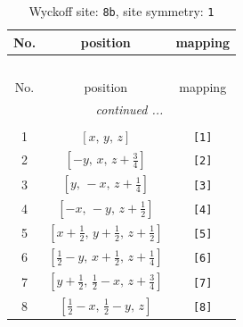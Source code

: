 \documentclass[fleqn,8pt]{jsarticle}
\begin{document}
\begin{longtable}{ccc}
\caption{Wyckoff site: {\tt 8b}, site symmetry: {\tt 1}}
 \\
 \hline \hline
No. & position & mapping \\ \hline \endfirsthead

\multicolumn{2}{l}{\tablename\ \thetable{}} \\
 \hline \hline
No. & position & mapping \\ \hline \endhead

 \hline \hline
\multicolumn{2}{r}{\footnotesize\it continued ...} \\ \endfoot

 \hline \hline
\multicolumn{2}{r}{} \\ \endlastfoot

1 & $\left[ x,\, y,\, z \right]$ & {\tt [1]} \\ \hline
2 & $\left[ - y,\, x,\, z + \frac{3}{4} \right]$ & {\tt [2]} \\ \hline
3 & $\left[ y,\, - x,\, z + \frac{1}{4} \right]$ & {\tt [3]} \\ \hline
4 & $\left[ - x,\, - y,\, z + \frac{1}{2} \right]$ & {\tt [4]} \\ \hline
5 & $\left[ x + \frac{1}{2},\, y + \frac{1}{2},\, z + \frac{1}{2} \right]$ & {\tt [5]} \\ \hline
6 & $\left[ \frac{1}{2} - y,\, x + \frac{1}{2},\, z + \frac{1}{4} \right]$ & {\tt [6]} \\ \hline
7 & $\left[ y + \frac{1}{2},\, \frac{1}{2} - x,\, z + \frac{3}{4} \right]$ & {\tt [7]} \\ \hline
8 & $\left[ \frac{1}{2} - x,\, \frac{1}{2} - y,\, z \right]$ & {\tt [8]} \\
\end{longtable}
\end{document}
